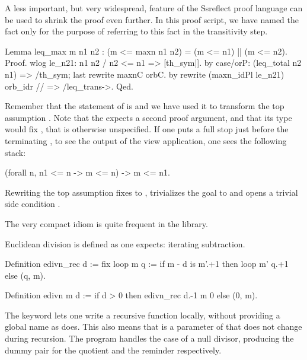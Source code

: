 A less important, but very widespread, feature of the Ssreflect
proof language can be used to shrink the proof even further.
In this proof script, we have named the fact  only for the
purpose of referring to this fact in the transitivity step.


\begin{coq}{}{}
Lemma leq_max m n1 n2 : (m <= maxn n1 n2) = (m <= n1) || (m <= n2).
Proof.
wlog le_n21: n1 n2 / n2 <= n1 => [th_sym|].
  by case/orP: (leq_total n2 n1) => /th_sym; last rewrite maxnC orbC.
by rewrite (maxn_idPl le_n21) orb_idr // => /leq_trans->.
Qed.
\end{coq}

Remember that the statement of
 is  and
we have used it to transform the top assumption .  Note that
the  expects a second proof argument, and that its type
would fix , that is otherwise unspecified.  If one puts a
full stop just before the terminating \C{->}, to see the output of
the view application, one sees the following stack:

\begin{coq}{}{}
(forall n, n1 <= n -> m <= n) -> m <= n1.
\end{coq}

Rewriting the top assumption fixes  to , trivializes
the goal  to  and opens a trivial side
condition .

The very compact idiom  is quite frequent in the
\mcbMC{} library.

\label{sec:edivn}

Euclidean division is defined as one expects: iterating subtraction.

\begin{coq}{}{}
Definition edivn_rec d :=
  fix loop m q := if m - d is m'.+1 then loop m' q.+1 else (q, m).

Definition edivn m d := if d > 0 then edivn_rec d.-1 m 0 else (0, m).
\end{coq}

The  keyword lets one write a recursive function locally, without
providing a global name as  does.  This also means that 
is a parameter of  that does not change during recursion.
The  program handles the case of a null divisor, producing
the dummy pair  for the quotient and the reminder respectively.

